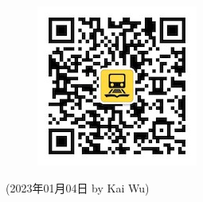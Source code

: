 \begin{enumerate}
\begin{minipage}{0.2\textwidth}
\begin{figure}[H]
                \includegraphics[width=0.95\columnwidth, center]{author-folder/Kai.Wu/qrcode_huitongstudent_1.jpg}
            \end{figure}
        \end{minipage}

\end{enumerate}


\begin{flushright}
(2023年01月04日 by Kai Wu)
\end{flushright}






% 
